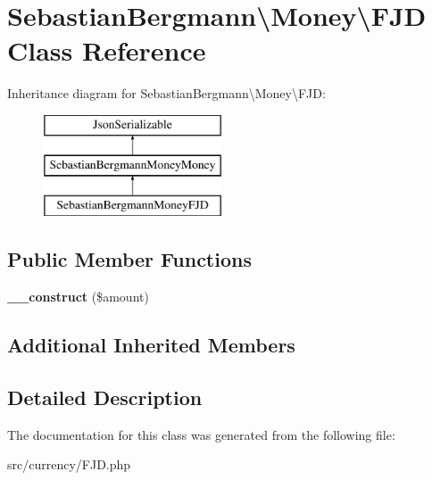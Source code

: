 \hypertarget{classSebastianBergmann_1_1Money_1_1FJD}{}\section{Sebastian\+Bergmann\textbackslash{}Money\textbackslash{}F\+J\+D Class Reference}
\label{classSebastianBergmann_1_1Money_1_1FJD}
Inheritance diagram for Sebastian\+Bergmann\textbackslash{}Money\textbackslash{}F\+J\+D\+:\begin{figure}[H]
\begin{center}
\leavevmode
\includegraphics[height=3.000000cm]{classSebastianBergmann_1_1Money_1_1FJD}
\end{center}
\end{figure}
\subsection*{Public Member Functions}
\begin{DoxyCompactItemize}
\item 
\hypertarget{classSebastianBergmann_1_1Money_1_1FJD_aec7ac9a3a35728e7b6e01bbeaef81df3}{}{\bfseries \+\_\+\+\_\+construct} (\$amount)\label{classSebastianBergmann_1_1Money_1_1FJD_aec7ac9a3a35728e7b6e01bbeaef81df3}

\end{DoxyCompactItemize}
\subsection*{Additional Inherited Members}


\subsection{Detailed Description}


The documentation for this class was generated from the following file\+:\begin{DoxyCompactItemize}
\item 
src/currency/F\+J\+D.\+php\end{DoxyCompactItemize}

